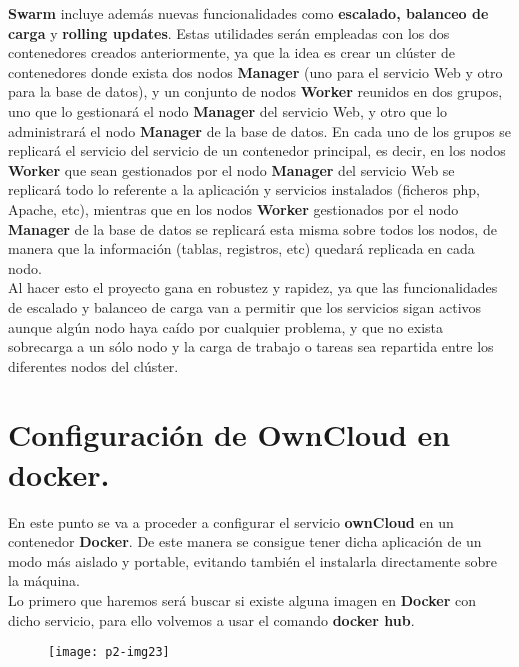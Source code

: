 \documentclass[10pt]{article}
\begin{document}
\textbf{Swarm} incluye además nuevas funcionalidades como \textbf{escalado, balanceo de carga} y \textbf{rolling updates}. Estas 
utilidades serán empleadas con los dos contenedores creados anteriormente, ya que la idea es crear un clúster de contenedores donde exista dos nodos \textbf{Manager} (uno para el servicio Web y otro para la base de datos), y un conjunto de nodos \textbf{Worker} reunidos en dos grupos, uno que lo gestionará el nodo \textbf{Manager} del servicio Web, y otro que lo administrará el nodo \textbf{Manager} de la base de datos. En cada uno de los grupos se replicará el servicio del servicio de un contenedor principal, es decir, en los nodos \textbf{Worker} que sean gestionados por el nodo \textbf{Manager} del servicio Web se replicará todo lo referente a la aplicación y servicios instalados (ficheros php, Apache, etc), mientras que en los nodos \textbf{Worker} gestionados por el nodo \textbf{Manager} de la base de datos se replicará esta misma sobre todos los nodos, de manera que la información (tablas, registros, etc) quedará replicada en cada nodo. \\

Al hacer esto el proyecto gana en robustez y rapidez, ya que las funcionalidades de escalado y balanceo de carga van a permitir que los servicios sigan activos aunque algún nodo haya caído por cualquier problema, y que no exista sobrecarga a un sólo nodo y la carga de trabajo o tareas sea repartida entre los diferentes nodos del clúster.\\

\section{Configuración de OwnCloud en docker.} 
En este punto se va a proceder a configurar el servicio \textbf{ownCloud} en un contenedor \textbf{Docker}. De este manera se consigue tener dicha aplicación de un modo más aislado y portable, evitando también el instalarla directamente sobre la máquina.\\

Lo primero que haremos será buscar si existe alguna imagen en \textbf{Docker} con dicho servicio, para ello volvemos a usar el comando \textbf{docker hub}.\\

 \begin{figure}[H]
	\begin{center}
 		\texttt{[image: p2-img23]}
	\end{center} 
\end{figure}
\end{document}
